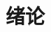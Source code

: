 \documentclass[10.5pt,twocolumn]{jbuaa}
\begin{document}


%
%
%
%
%
%

\section{绪论}
\end{document}
